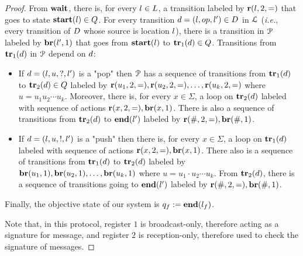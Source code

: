 \begin{proof}
From $\mathbf{wait}$, there is, for every $l \in L$, a transition labeled by $\rec{\mathsf{\lstate}}{2}{\eqtestact}$ that goes to state $\mathbf{start}(l) \in Q$. 
For every transition $\ltrans = (\lstate, \mathsf{op}, \lstate') \in \ltransitions$ in $\mathcal{L}$ (\emph{i.e.}, every transition of $D$ whose source is location $l$), there is a transition in $\mathcal{P}$ labeled by $\br{\mathsf{\lstate'}}{1}$ that goes from $\mathbf{start}(l)$ to $\mathbf{tr}_1(d) \in Q$. 
Transitions from $\mathbf{tr}_1(d)$ in $\mathcal{P}$ depend on $d$:
\begin{itemize}
\item If $d=(l, u,?, l')$ is a "pop" then $\mathcal{P}$ has a sequence of transitions from $\mathbf{tr}_1(d)$ to $\mathbf{tr}_2(d) \in Q$ labeled by $\rec{\mathsf{u_1}}{2}{\eqtestact}, \rec{\mathsf{u_2}}{2}{\eqtestact}, \dots, \rec{\mathsf{u_k}}{2}{\eqtestact}$ where $u = u_1 u_2 \cdots u_k$. Moreover, there is, for every $x \in \Sigma$, a loop on $\mathbf{tr}_2(d)$ labeled with sequence of actions $\rec{\mathsf{x}}{2}{\eqtestact}, \br{\mathsf{x}}{1}$. There is also a sequence of  transitions from $\mathbf{tr}_2(d)$ to $\mathbf{end}(l')$ labeled by $\rec{\mathsf{\#}}{2}{\eqtestact}, \br{\mathsf{\#}}{1}$.
\item If $d= (l, u,!, l')$ is a "push" then there is, for every $x \in \Sigma$, a loop on $\mathbf{tr}_1(d)$ labeled with sequence of actions $\rec{\mathsf{x}}{2}{\eqtestact}, \br{\mathsf{x}}{1}$. There also is a sequence of transitions from $\mathbf{tr}_1(d)$ to $\mathbf{tr}_2(d)$ labeled by $\br{\mathsf{u_1}}{1}, \br{\mathsf{u_2}}{1}, \dots, \br{\mathsf{u_k}}{1}$ where $u = u_1 \cdot u_2 \cdots u_k$. From $\mathbf{tr}_2(d)$, there is  a sequence of transitions going to $\mathbf{end}(l')$ labeled by $\rec{\mathsf{\#}}{2}{\eqtestact}, \br{\mathsf{\#}}{1}$.
\end{itemize}
Finally, the objective state of our system is $q_f := \mathbf{end}(l_f)$.

Note that, in this protocol, register $1$ is broadcast-only, therefore acting as a signature for message, and register $2$ is reception-only, therefore used to check the signature of messages.


\end{proof}
